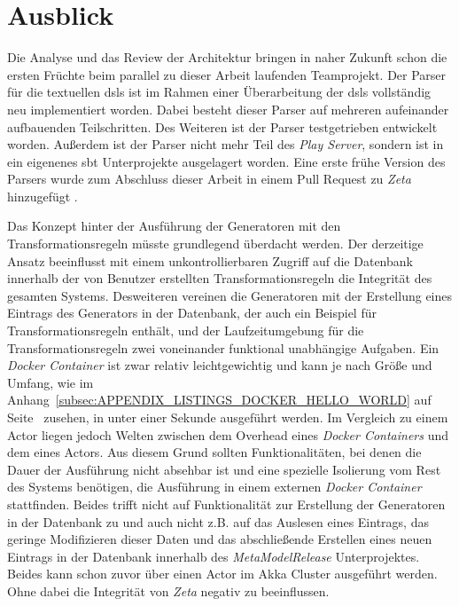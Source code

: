 \section{Ausblick}

Die Analyse und das Review der Architektur bringen in naher Zukunft schon die ersten Früchte beim parallel zu dieser Arbeit laufenden Teamprojekt. Der Parser für die textuellen \acp{dsl} ist im Rahmen einer Überarbeitung der \acp{dsl} vollständig neu implementiert worden. Dabei besteht dieser Parser auf mehreren aufeinander aufbauenden Teilschritten. Des Weiteren ist der Parser testgetrieben entwickelt worden. Außerdem ist der Parser nicht mehr Teil des \textit{Play Server}, sondern ist in ein eigenenes \ac{sbt} Unterprojekte ausgelagert worden. Eine erste frühe Version des Parsers wurde zum Abschluss dieser Arbeit in einem Pull Request zu \textit{Zeta} hinzugefügt \cite{zeta_pull_parser}.

Das Konzept hinter der Ausführung der Generatoren mit den Transformationsregeln müsste grundlegend überdacht werden. Der derzeitige Ansatz beeinflusst mit einem unkontrollierbaren Zugriff auf die Datenbank innerhalb der von Benutzer erstellten Transformationsregeln die Integrität des gesamten Systems. Desweiteren vereinen die Generatoren mit der Erstellung eines Eintrags des Generators in der Datenbank, der auch ein Beispiel für Transformationsregeln enthält, und der Laufzeitumgebung für die Transformationsregeln zwei voneinander funktional unabhängige Aufgaben. Ein \textit{Docker Container} ist zwar relativ leichtgewichtig und kann je nach Größe und Umfang, wie im Anhang~\ref{subsec:APPENDIX_LISTINGS_DOCKER_HELLO_WORLD} auf Seite~\pageref{subsec:APPENDIX_LISTINGS_DOCKER_HELLO_WORLD} zusehen, in unter einer Sekunde ausgeführt werden. Im Vergleich zu einem Actor liegen jedoch Welten zwischen dem Overhead eines \textit{Docker Containers} und dem eines Actors. Aus diesem Grund sollten Funktionalitäten, bei denen die Dauer der Ausführung nicht absehbar ist und eine spezielle Isolierung vom Rest des Systems benötigen, die Ausführung in einem externen \textit{Docker Container} stattfinden. Beides trifft nicht auf Funktionalität zur Erstellung der Generatoren in der Datenbank zu und auch nicht z.B. auf das Auslesen eines Eintrags, das geringe Modifizieren dieser Daten und das abschließende Erstellen eines neuen Eintrags in der Datenbank innerhalb des \textit{MetaModelRelease} Unterprojektes. Beides kann schon zuvor über einen Actor im Akka Cluster ausgeführt werden. Ohne dabei die Integrität von \textit{Zeta} negativ zu beeinflussen.

